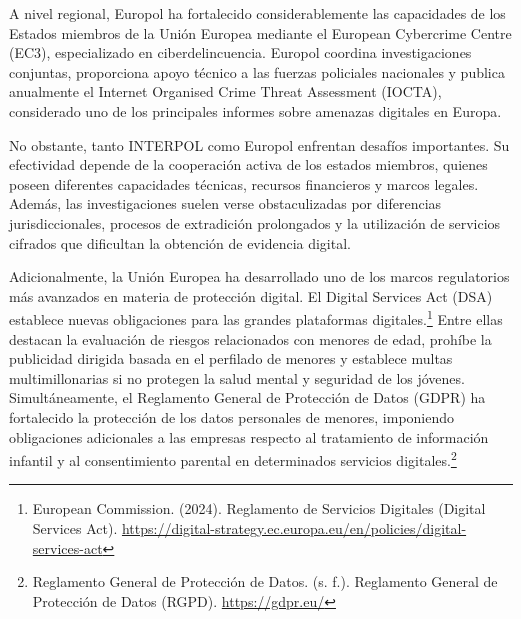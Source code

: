 A nivel regional, Europol ha fortalecido considerablemente las capacidades de los Estados miembros de la Unión Europea mediante el European Cybercrime Centre (EC3), especializado en ciberdelincuencia. Europol coordina investigaciones conjuntas, proporciona apoyo técnico a las fuerzas policiales nacionales y publica anualmente el Internet Organised Crime Threat Assessment (IOCTA), considerado uno de los principales informes sobre amenazas digitales en Europa.

No obstante, tanto INTERPOL como Europol enfrentan desafíos importantes. Su efectividad depende de la cooperación activa de los estados miembros, quienes poseen diferentes capacidades técnicas, recursos financieros y marcos legales. Además, las investigaciones suelen verse obstaculizadas por diferencias jurisdiccionales, procesos de extradición prolongados y la utilización de servicios cifrados que dificultan la obtención de evidencia digital.

Adicionalmente, la Unión Europea ha desarrollado uno de los marcos regulatorios más avanzados en materia de protección digital. El Digital Services Act (DSA) establece nuevas obligaciones para las grandes plataformas digitales.\footnote{European Commission. (2024). Reglamento de Servicios Digitales (Digital Services Act). \url{https://digital-strategy.ec.europa.eu/en/policies/digital-services-act}} Entre ellas destacan la evaluación de riesgos relacionados con menores de edad, prohíbe la publicidad dirigida basada en el perfilado de menores y establece multas multimillonarias si no protegen la salud mental y seguridad de los jóvenes. Simultáneamente, el Reglamento General de Protección de Datos (GDPR) ha fortalecido la protección de los datos personales de menores, imponiendo obligaciones adicionales a las empresas respecto al tratamiento de información infantil y al consentimiento parental en determinados servicios digitales.\footnote{Reglamento General de Protección de Datos. (s. f.). Reglamento General de Protección de Datos (RGPD). \url{https://gdpr.eu/}}
